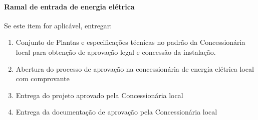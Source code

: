 \paragraph{Ramal de entrada de energia elétrica}
Se este item for aplicável, entregar:
\begin{enumerate}
	\item Conjunto de Plantas e especificações técnicas no padrão da Concessionária local para obtenção de aprovação legal e concessão da instalação.
	
	\item Abertura do processo de aprovação na concessionária de energia elétrica local com comprovante
	
	\item Entrega do projeto aprovado pela Concessionária local
	
	\item Entrega da documentação de aprovação pela Concessionária local
\end{enumerate}


